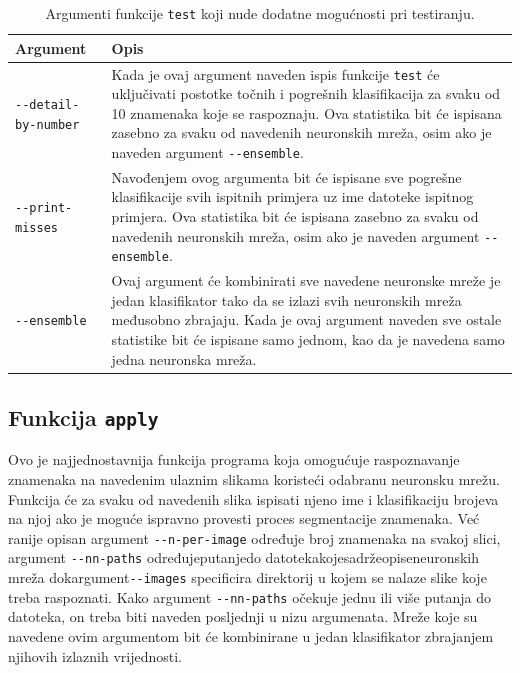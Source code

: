 \begin{table}[!htb]
    \caption{Argumenti funkcije \texttt{test} koji nude dodatne mogućnosti pri testiranju.}
    \label{tab:test-args}
    \scriptsize
    \centering
    \begin{tabular}{|M{3.5cm}|M{8.5cm}|}
        \hline
        Argument & Opis \\
        \hline
        \texttt{-{}-detail-by-number} & Kada je ovaj argument naveden ispis funkcije \texttt{test} će uključivati
        postotke točnih i pogrešnih klasifikacija za svaku od 10 znamenaka koje se raspoznaju. Ova statistika bit će
        ispisana zasebno za svaku od navedenih neuronskih mreža, osim ako je naveden argument \texttt{-{}-ensemble}. \\
        \hline
        \texttt{-{}-print-misses} & Navođenjem ovog argumenta bit će ispisane sve pogrešne klasifikacije svih ispitnih
        primjera uz ime datoteke ispitnog primjera. Ova statistika bit će ispisana zasebno za svaku od navedenih
        neuronskih mreža, osim ako je naveden argument \texttt{-{}-ensemble}. \\
        \hline
        \texttt{-{}-ensemble} & Ovaj argument će kombinirati sve navedene neuronske mreže je jedan klasifikator tako da
        se izlazi svih neuronskih mreža međusobno zbrajaju. Kada je ovaj argument naveden sve ostale statistike bit će
        ispisane samo jednom, kao da je navedena samo jedna neuronska mreža. \\
        \hline
    \end{tabular}
\end{table}

\subsection{Funkcija \texttt{apply}}
\label{subsec:funkcija-apply}
Ovo je najjednostavnija funkcija programa koja omogućuje raspoznavanje znamenaka na navedenim ulaznim slikama koristeći
odabranu neuronsku mrežu. Funkcija će za svaku od navedenih slika ispisati njeno ime i klasifikaciju brojeva na njoj
ako je moguće ispravno provesti proces segmentacije znamenaka. Već ranije opisan argument \texttt{-{}-n-per-image}
određuje broj znamenaka na svakoj slici, argument \texttt{-{}-nn-paths} određuje\hfill{}putanje\hfill{}do\hfill{}
datoteka\hfill{}koje\hfill{}sadrže\hfill{}opise\hfill{}neuronskih mreža dok\hfill{}argument\break\texttt{-{}-images}
specificira direktorij u kojem se nalaze slike koje treba raspoznati. Kako argument \texttt{-{}-nn-paths} očekuje jednu
ili više putanja do datoteka, on treba biti naveden posljednji u nizu argumenata. Mreže koje su navedene ovim argumentom
bit će kombinirane u jedan klasifikator zbrajanjem njihovih izlaznih vrijednosti.
